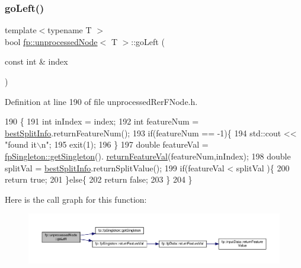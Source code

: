 \subsubsection{\texorpdfstring{go\+Left()}{goLeft()}\hspace{0.1cm}{\footnotesize\ttfamily [2/2]}}
{\footnotesize\ttfamily template$<$typename T $>$ \\
bool \hyperlink{classfp_1_1unprocessedNode}{fp\+::unprocessed\+Node}$<$ T $>$\+::go\+Left (\begin{DoxyParamCaption}\item[{const int \&}]{index }\end{DoxyParamCaption})\hspace{0.3cm}{\ttfamily [inline]}}



Definition at line 190 of file unprocessed\+Rer\+F\+Node.\+h.


\begin{DoxyCode}
190                                     \{
191     \textcolor{keywordtype}{int} inIndex = index;
192     \textcolor{keywordtype}{int} featureNum = \hyperlink{classfp_1_1unprocessedNode_ae60e5f84c9a80537cb84dfd17e70e893}{bestSplitInfo}.returnFeatureNum();
193     \textcolor{keywordflow}{if}(featureNum == -1)\{
194         std::cout << \textcolor{stringliteral}{"found it\(\backslash\)n"};
195         exit(1);
196     \}
197     \textcolor{keywordtype}{double} featureVal = \hyperlink{classfp_1_1fpSingleton_a8bdae77b68521003e3fc630edec2e240}{fpSingleton::getSingleton}().
      \hyperlink{classfp_1_1fpSingleton_aacc2eb894a219e2fe234743b51fa1a76}{returnFeatureVal}(featureNum,inIndex);
198         \textcolor{keywordtype}{double} splitVal = \hyperlink{classfp_1_1unprocessedNode_ae60e5f84c9a80537cb84dfd17e70e893}{bestSplitInfo}.returnSplitValue();
199                     \textcolor{keywordflow}{if}(featureVal < splitVal )\{
200                         \textcolor{keywordflow}{return} \textcolor{keyword}{true};
201                     \}\textcolor{keywordflow}{else}\{
202                         \textcolor{keywordflow}{return} \textcolor{keyword}{false};
203                     \}
204                 \}
\end{DoxyCode}
Here is the call graph for this function\+:
\nopagebreak
\begin{figure}[H]
\begin{center}
\leavevmode
\includegraphics[width=350pt]{classfp_1_1unprocessedNode_ad4ffdb4f4b91d6d21f8954f3c80a3617_cgraph}
\end{center}
\end{figure}
\mbox{\label{classfp_1_1unprocessedNode_a8cedeb8c4c88345ff97f9afb89b3ccd0}} 
